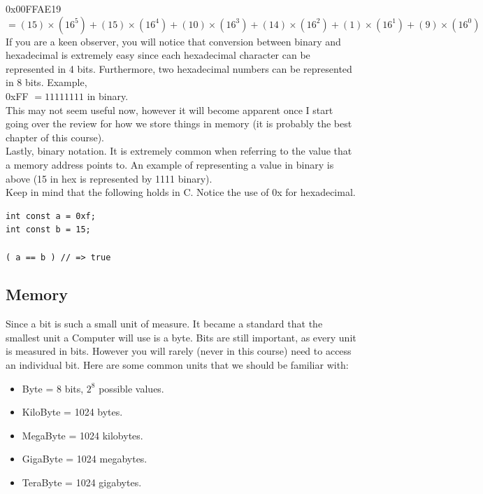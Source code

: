 \documentclass[12pt,extarticle]{article}
\begin{document}
0x00FFAE19 $= (15) \times (16^{5}) + (15) \times (16^{4}) + (10) \times (16^{3}) + (14) \times (16^{2}) + (1) \times (16^{1}) + (9) \times (16^{0})$\\

If you are a keen observer, you will notice that conversion between binary and hexadecimal is extremely easy since each hexadecimal character can be represented in 4 bits. Furthermore, two hexadecimal numbers can be represented in 8 bits. Example,\\

0xFF $= 11111111$ in binary.\\

This may not seem useful now, however it will become apparent once I start going over the review for how we store things in memory (it is probably the best chapter of this course).\\

Lastly, binary notation. It is extremely common when referring to the value that a memory address points to. An example of representing a value in binary is above (15 in hex is represented by 1111 binary).\\

Keep in mind that the following holds in C. Notice the use of 0x for hexadecimal.\\

\lstset {
	language=c
}
\begin{lstlisting}
int const a = 0xf;
int const b = 15;

( a == b ) // => true
\end{lstlisting}

\subsection{Memory}

Since a bit is such a small unit of measure. It became a standard that the smallest unit a Computer will use is a byte. Bits are still important, as every unit is measured in bits. However you will rarely (never in this course) need to access an individual bit. Here are some common units that we should be familiar with:

\begin{itemize}

\item Byte = 8 bits, $2^{8}$ possible values.
\item KiloByte = 1024 bytes.
\item MegaByte = 1024 kilobytes.
\item GigaByte = 1024 megabytes.
\item TeraByte = 1024 gigabytes.

\end{itemize}
\end{document}

